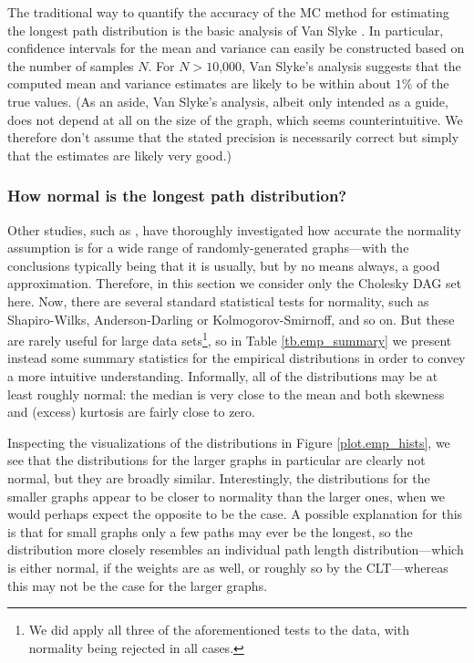 \documentclass[12pt]{article}
\begin{document}
The traditional way to quantify the accuracy of the MC method for estimating the longest path distribution is the basic analysis of Van Slyke \cite{van63}. In particular, confidence intervals for the mean and variance can easily be constructed based on the number of samples $N$. For $N > 10$,$000$, Van Slyke's analysis suggests that the computed mean and variance estimates are likely to be within about $1\%$ of the true values. (As an aside, Van Slyke's analysis, albeit only intended as a guide, does not depend at all on the size of the graph, which seems counterintuitive. We therefore don't assume that the stated precision is necessarily correct but simply that the estimates are likely very good.)


\subsubsection{How normal is the longest path distribution?}
\label{subsubsect.how_normal}

Other studies, such as \cite{can16}, have thoroughly investigated how accurate the normality assumption is for a wide range of randomly-generated graphs---with the conclusions typically being that it is usually, but by no means always, a good approximation. Therefore, in this section we consider only the Cholesky DAG set here. Now, there are several standard statistical tests for normality, such as Shapiro-Wilks, Anderson-Darling or Kolmogorov-Smirnoff, and so on. But these are rarely useful for large data sets\footnote{We did apply all three of the aforementioned tests to the data, with normality being rejected in all cases.}, so in Table \ref{tb.emp_summary} we present instead some summary statistics for the empirical distributions in order to convey a more intuitive understanding. Informally, all of the distributions may be at least roughly normal: the median is very close to the mean and both skewness and (excess) kurtosis are fairly close to zero.

Inspecting the visualizations of the distributions in Figure \ref{plot.emp_hists}, we see that the distributions for the larger graphs in particular are clearly not normal, but they are broadly similar. Interestingly, the distributions for the smaller graphs appear to be closer to normality than the larger ones, when we would perhaps expect the opposite to be the case. A possible explanation for this is that for small graphs only a few paths may ever be the longest, so the distribution more closely resembles an individual path length distribution---which is either normal, if the weights are as well, or roughly so by the CLT---whereas this may not be the case for the larger graphs.  
\end{document}
